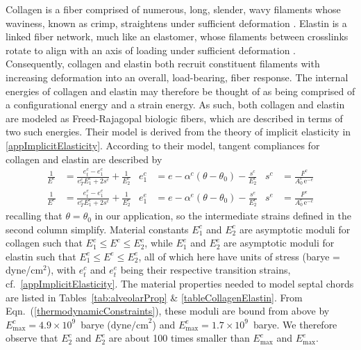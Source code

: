 Collagen is a fiber comprised of numerous, long, slender, wavy filaments whose waviness, known as crimp, straightens under sufficient deformation \cite{Kastelicetal'78,FreedDoehring05}.  Elastin is a linked fiber network, much like an elastomer, whose filaments between crosslinks rotate to align with an axis of loading under sufficient deformation \cite{AaronGosline81,Urry89}.  Consequently, collagen and elastin both recruit constituent filaments with increasing deformation into an overall, load-bearing, fiber response.  The internal energies of collagen and elastin may therefore be thought of as being comprised of a configurational energy and a strain energy.  As such, both collagen and elastin are modeled as Freed-Rajagopal biologic fibers, which are described in terms of two such energies.  Their model is derived from the theory of implicit elasticity in \ref{appImplicitElasticity}.  According to their model, tangent compliances for collagen and elastin are described by
\begin{subequations}
    \label{septalChordModuli}
    \begin{align}
	\frac{1}{E^c} & = \frac{e_t^c - e_1^c}{e_T^c E_1^c + 2s^c} + \frac{1}{E_2^c} &
	e_1^c & = e - \alpha^c (\theta - \theta_0) - \frac{s^c}{E_2^c} &
    s^c & = \frac{F^c}{A_0^c \, \mathrm{e}^{-e}} \\
    \frac{1}{E^e} & = \frac{e_t^e - e_1^e}{e_T^e E_1^e + 2s^e} + \frac{1}{E_2^e} &
    e_1^e & = e - \alpha^e (\theta - \theta_0) - \frac{s^e}{E_2^e} &
    s^e & = \frac{F^e}{A_0^e \, \mathrm{e}^{-e}}
    \end{align}
\end{subequations}
recalling that $\theta = \theta_0$ in our application, so the intermediate strains defined in the second column simplify.  Material constants $E_1^c$ and $E_2^c$ are asymptotic moduli for collagen such that $E_1^c \leq E^c \leq E^c_2$, while $E_1^e$ and $E_2^e$ are asymptotic moduli for elastin such that $E^e_1 \leq E^e \leq E^e_2$, all of which here have units of stress (barye = dyne/$\mathrm{cm}^2$), with $e_t^c$ and $e_t^e$ being their respective transition strains, cf.\ \ref{appImplicitElasticity}. The material properties needed to model septal chords are listed in Tables~\ref{tab:alveolarProp} \& \ref{tableCollagenElastin}.  From Eqn.~(\ref{thermodynamicConstraints}), these moduli are bound from above by $E^c_{\max} = 4.9 \times 10^9$~barye ($\text{dyne/cm}^2$) and $E^e_{\max} = 1.7 \times 10^9$~barye.  We therefore observe that $E^c_2$ and $E^e_2$ are about 100 times smaller than $E^c_{\max}$ and $E^e_{\max}$.

